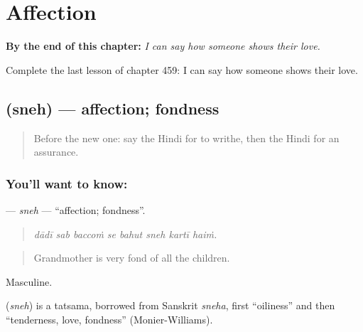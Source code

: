 
\chapter{Affection}
\label{ch:hi-affection}

\begin{chapteropening}
\textbf{By the end of this chapter:} \emph{I can say how someone shows their love.}

Complete the last lesson of chapter 459: I can say how someone shows their love.
\end{chapteropening}

\section[\texorpdfstring{\hi{स्नेह} (sneh)}{स्नेह (sneh)}]{ (sneh) — affection; fondness}

\label{lesson:HI-C459-sneh}



\begin{quote}
Before the new one: say the Hindi for to writhe, then the Hindi for an assurance.
\end{quote}

\subsection*{You'll want to know: }
\textbf{} — \emph{sneh} — \textquotedblleft{}affection; fondness\textquotedblright{}.

\begin{quote}
       
\end{quote}

\begin{quote}
\emph{dādī sab baccoṁ se bahut sneh kartī haiṁ.}
\end{quote}

\begin{quote}
Grandmother is very fond of all the children.
\end{quote}

Masculine.

\begin{cousinweb}
\textbf{} (\emph{sneh}) is a tatsama, borrowed from Sanskrit \emph{sneha}, first \textquotedblleft{}oiliness\textquotedblright{} and then \textquotedblleft{}tenderness, love, fondness\textquotedblright{} (Monier-Williams).
\end{cousinweb}

